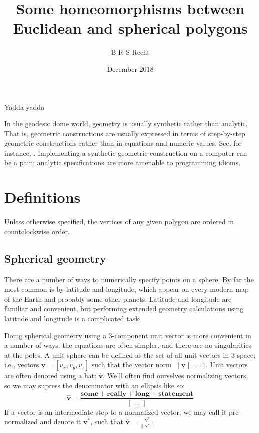 \documentclass{amsart}[12pt]
\title{Some homeomorphisms between Euclidean and spherical polygons}
\author{B R S Recht}
\date{December 2018}
\begin{document}
\maketitle

Yadda yadda\cite{kahn}

In the geodesic dome world, geometry is usually synthetic rather than
analytic. That is, geometric constructions are usually expressed in terms of
step-by-step geometric constructions rather than in equations and numeric
values. See, for instance, \cite{kenner}. Implementing a synthetic geometric
construction on a computer can be a pain; analytic specifications are more
amenable to programming idioms.

\section{Definitions}
Unless otherwise specified, the vertices of any given polygon are ordered in
countclockwise order.

\subsection{Spherical geometry}
There are a number of ways to numerically specify points on a sphere. By far
the most common is by latitude and longitude, which appear on every modern map
of the Earth and probably some other planets. Latitude and longitude are
familiar and convenient, but performing extended geometry calculations using
latitude and longitude is a complicated task.

Doing spherical geometry using a 3-component unit vector is more convenient
in a number of ways: the equations are often simpler, and there are no
singularities at the poles. A unit sphere can be defined as the set of all unit
vectors in 3-space; i.e., vectors $\mathbf v = [v_x, v_y, v_z]$ such that the
vector norm $\|\mathbf v \|=1$. Unit vectors are often denoted using a hat:
$\hat{\mathbf v}$. We'll often find ourselves normalizing vectors,
so we may supress the denominator with an ellipsis like so:
\begin{equation}
  \hat{\mathbf v} = \frac{\mathbf{some+really+long+statement}}{\|\dots\|}
\end{equation}
If a vector is an intermediate step to a normalized vector,
we may call it pre-normalized and denote it ${\mathbf v}^*$,
such that $\hat{\mathbf v} = \frac{{\mathbf v}^*}{ \|{\mathbf v}^*\|}$
\end{document}

